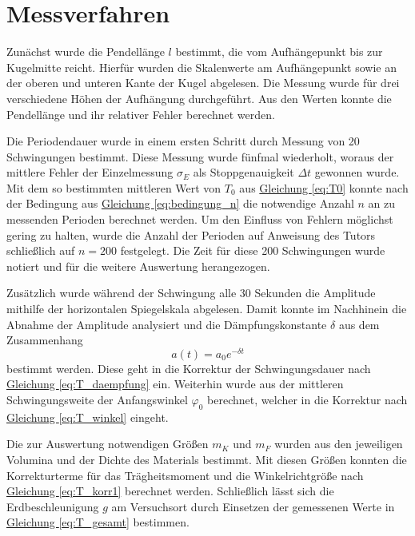 \section{Messverfahren}
Zunächst wurde die Pendellänge $l$ bestimmt, die vom Aufhängepunkt bis zur Kugelmitte reicht. Hierfür wurden die Skalenwerte am Aufhängepunkt sowie an der oberen und unteren Kante der Kugel abgelesen. Die Messung wurde für drei verschiedene Höhen der Aufhängung durchgeführt. Aus den Werten konnte die Pendellänge und ihr relativer Fehler berechnet werden.

Die Periodendauer wurde in einem ersten Schritt durch Messung von 20 Schwingungen bestimmt. Diese Messung wurde fünfmal wiederholt, woraus der mittlere Fehler der Einzelmessung $\sigma_E$ als Stoppgenauigkeit $\Delta t$ gewonnen wurde. Mit dem so bestimmten mittleren Wert von $T_0$ aus \hyperref[eq:T0]{Gleichung \ref*{eq:T0}} konnte nach der Bedingung aus \hyperref[eq:bedingung_n]{Gleichung \ref*{eq:bedingung_n}} die notwendige Anzahl $n$ an zu messenden Perioden berechnet werden. Um den Einfluss von Fehlern möglichst gering zu halten, wurde die Anzahl der Perioden auf Anweisung des Tutors schließlich auf $n = 200$ festgelegt. Die Zeit für diese 200 Schwingungen wurde notiert und für die weitere Auswertung herangezogen. 

Zusätzlich wurde während der Schwingung alle 30 Sekunden die Amplitude mithilfe der horizontalen Spiegelskala abgelesen. Damit konnte im Nachhinein die Abnahme der Amplitude analysiert und die Dämpfungskonstante $\delta$ aus dem Zusammenhang
\begin{equation}
    a(t) = a_0 e^{-\delta t}
    \label{eq:amplitude}
\end{equation}
bestimmt werden. Diese geht in die Korrektur der Schwingungsdauer nach \hyperref[eq:T_daempfung]{Gleichung \ref*{eq:T_daempfung}} ein. Weiterhin wurde aus der mittleren Schwingungsweite der Anfangswinkel $\varphi_0$ berechnet, welcher in die Korrektur nach \hyperref[eq:T_winkel]{Gleichung \ref*{eq:T_winkel}} eingeht.

Die zur Auswertung notwendigen Größen $m_K$ und $m_F$ wurden aus den jeweiligen Volumina und der Dichte des Materials bestimmt. Mit diesen Größen konnten die Korrekturterme für das Trägheitsmoment und die Winkelrichtgröße nach \hyperref[eq:T_korr1]{Gleichung \ref*{eq:T_korr1}} berechnet werden. Schließlich lässt sich die Erdbeschleunigung $g$ am Versuchsort durch Einsetzen der gemessenen Werte in \hyperref[eq:T_gesamt]{Gleichung \ref*{eq:T_gesamt}} bestimmen.

